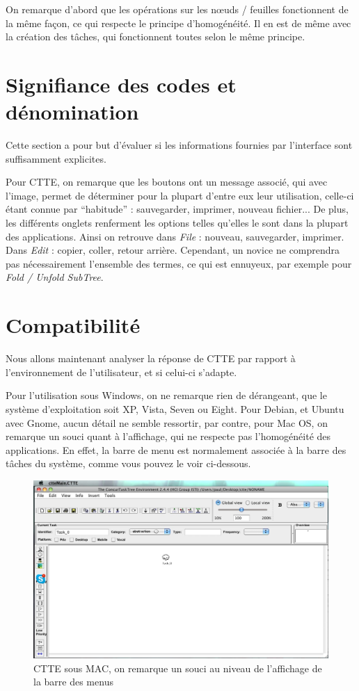 \documentclass[12pt, a4paper]{article}
\begin{document}
On remarque d'abord que les opérations sur les nœuds / feuilles fonctionnent de la même façon, ce qui respecte le principe d'homogénéité. Il en est de même avec la création des tâches, qui fonctionnent toutes selon le même principe.

\section{Signifiance des codes et dénomination}
Cette section a pour but d'évaluer si les informations fournies par l'interface sont suffisamment explicites.

Pour CTTE, on remarque que les boutons ont un message associé, qui avec l'image, permet de déterminer pour la plupart d'entre eux leur utilisation, celle-ci étant connue par ``habitude'' : sauvegarder, imprimer, nouveau fichier... De plus, les différents onglets renferment les options telles qu'elles le sont dans la plupart des applications. Ainsi on retrouve dans \emph{File} : nouveau, sauvegarder, imprimer. Dans \emph{Edit} : copier, coller, retour arrière. Cependant, un novice ne comprendra pas nécessairement l'ensemble des termes, ce qui est ennuyeux, par exemple pour \emph{Fold / Unfold SubTree}.

\section{Compatibilité}
Nous allons maintenant analyser la réponse de CTTE par rapport à l'environnement de l'utilisateur, et si celui-ci s'adapte.


Pour l'utilisation sous Windows, on ne remarque rien de dérangeant, que le système d'exploitation soit XP, Vista, Seven ou Eight. Pour Debian, et Ubuntu avec Gnome, aucun détail ne semble ressortir, par contre, pour Mac OS, on remarque un souci quant à l'affichage, qui ne respecte pas l'homogénéité des applications. En effet, la barre de menu est normalement associée à la barre des tâches du système, comme vous pouvez le voir ci-dessous.

\begin{figure}
   \includegraphics[scale = 0.5]{SoucisIHM.jpg}
	\caption{CTTE sous MAC, on remarque un souci au niveau de l'affichage de la barre des menus}
\end{figure}
\end{document}
